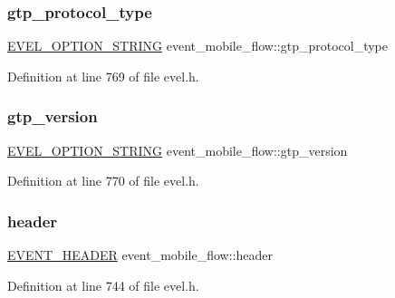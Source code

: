 \subsubsection{\texorpdfstring{gtp\+\_\+protocol\+\_\+type}{gtp\_protocol\_type}}
{\footnotesize\ttfamily \hyperlink{evel_8h_a0de5113a7b72de93c0c7b644f7ea7ec3}{E\+V\+E\+L\+\_\+\+O\+P\+T\+I\+O\+N\+\_\+\+S\+T\+R\+I\+NG} event\+\_\+mobile\+\_\+flow\+::gtp\+\_\+protocol\+\_\+type}



Definition at line 769 of file evel.\+h.

\hypertarget{structevent__mobile__flow_a9c9d6c5ca9f9e85dd73219b1c6172234}{}\label{structevent__mobile__flow_a9c9d6c5ca9f9e85dd73219b1c6172234} 
\subsubsection{\texorpdfstring{gtp\+\_\+version}{gtp\_version}}
{\footnotesize\ttfamily \hyperlink{evel_8h_a0de5113a7b72de93c0c7b644f7ea7ec3}{E\+V\+E\+L\+\_\+\+O\+P\+T\+I\+O\+N\+\_\+\+S\+T\+R\+I\+NG} event\+\_\+mobile\+\_\+flow\+::gtp\+\_\+version}



Definition at line 770 of file evel.\+h.

\hypertarget{structevent__mobile__flow_a212b03fad1a17580856482ca19d57a3c}{}\label{structevent__mobile__flow_a212b03fad1a17580856482ca19d57a3c} 
\subsubsection{\texorpdfstring{header}{header}}
{\footnotesize\ttfamily \hyperlink{evel_8h_aa0ea94c675729365ea7825c4fc7e06d8}{E\+V\+E\+N\+T\+\_\+\+H\+E\+A\+D\+ER} event\+\_\+mobile\+\_\+flow\+::header}



Definition at line 744 of file evel.\+h.

\hypertarget{structevent__mobile__flow_a88dc829e4f3464d48803a3a1dd277c4c}{}\label{structevent__mobile__flow_a88dc829e4f3464d48803a3a1dd277c4c} 
